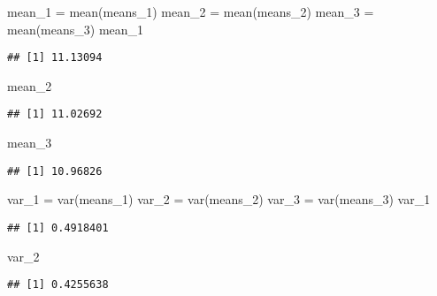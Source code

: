 \documentclass[
]{article}
\newenvironment{Shaded}{\begin{snugshade}}{\end{snugshade}}
\newcommand{\FunctionTok}[1]{\textcolor[rgb]{0.00,0.00,0.00}{#1}}
\newcommand{\NormalTok}[1]{#1}
\newcommand{\OtherTok}[1]{\textcolor[rgb]{0.56,0.35,0.01}{#1}}
\begin{document}
\begin{Shaded}
\begin{Highlighting}[]
\NormalTok{mean\_1 }\OtherTok{=} \FunctionTok{mean}\NormalTok{(means\_1)}
\NormalTok{mean\_2 }\OtherTok{=} \FunctionTok{mean}\NormalTok{(means\_2)}
\NormalTok{mean\_3 }\OtherTok{=} \FunctionTok{mean}\NormalTok{(means\_3)}
\NormalTok{mean\_1}
\end{Highlighting}
\end{Shaded}

\begin{verbatim}
## [1] 11.13094
\end{verbatim}

\begin{Shaded}
\begin{Highlighting}[]
\NormalTok{mean\_2}
\end{Highlighting}
\end{Shaded}

\begin{verbatim}
## [1] 11.02692
\end{verbatim}

\begin{Shaded}
\begin{Highlighting}[]
\NormalTok{mean\_3}
\end{Highlighting}
\end{Shaded}

\begin{verbatim}
## [1] 10.96826
\end{verbatim}

\begin{Shaded}
\begin{Highlighting}[]
\NormalTok{var\_1 }\OtherTok{=} \FunctionTok{var}\NormalTok{(means\_1)}
\NormalTok{var\_2 }\OtherTok{=} \FunctionTok{var}\NormalTok{(means\_2)}
\NormalTok{var\_3 }\OtherTok{=} \FunctionTok{var}\NormalTok{(means\_3)}
\NormalTok{var\_1}
\end{Highlighting}
\end{Shaded}

\begin{verbatim}
## [1] 0.4918401
\end{verbatim}

\begin{Shaded}
\begin{Highlighting}[]
\NormalTok{var\_2}
\end{Highlighting}
\end{Shaded}

\begin{verbatim}
## [1] 0.4255638
\end{verbatim}
\end{document}
